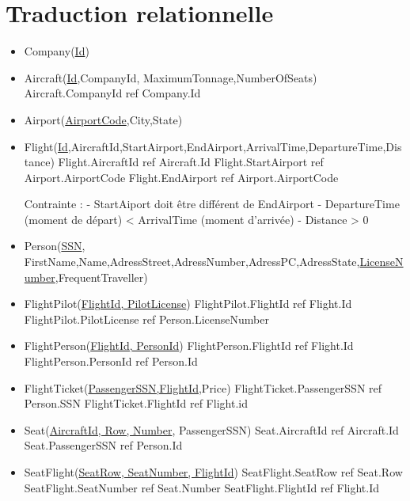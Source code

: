 \documentclass[french, utf8]{article}
\begin{document}
\section{Traduction relationnelle}
\begin{itemize}
    \item Company(\underline{Id})
    \item Aircraft(\underline{Id},CompanyId, MaximumTonnage,NumberOfSeats)
    \subitem Aircraft.CompanyId ref Company.Id

    \item Airport(\underline{AirportCode},City,State)
    \item Flight(\underline{Id},AircraftId,StartAirport,EndAirport,ArrivalTime,DepartureTime,Distance)
    \subitem Flight.AircraftId ref Aircraft.Id
    \subitem Flight.StartAirport ref Airport.AirportCode
    \subitem Flight.EndAirport ref Airport.AirportCode

    \subitem Contrainte :
    \subsubitem - StartAiport doit être différent de EndAirport
    \subsubitem - DepartureTime (moment de départ) < ArrivalTime (moment d'arrivée)
    \subsubitem - Distance > 0

    \item Person(\underline{SSN}, FirstName,Name,AdressStreet,AdressNumber,AdressPC,AdressState,\underline{LicenseNumber},FrequentTraveller)

    \item FlightPilot(\underline{FlightId, PilotLicense})
    \subitem FlightPilot.FlightId ref Flight.Id
    \subitem FlightPilot.PilotLicense ref Person.LicenseNumber

    \item FlightPerson(\underline{FlightId, PersonId})
    \subitem FlightPerson.FlightId ref Flight.Id
    \subitem FlightPerson.PersonId ref Person.Id

    \item FlightTicket(\underline{PassengerSSN,FlightId},Price)
    \subitem FlightTicket.PassengerSSN ref Person.SSN
    \subitem FlightTicket.FlightId ref Flight.id

    \item Seat(\underline{AircraftId, Row, Number}, PassengerSSN)
    \subitem Seat.AircraftId ref Aircraft.Id
    \subitem Seat.PassengerSSN ref Person.Id

    \item SeatFlight(\underline{SeatRow, SeatNumber, FlightId})
    \subitem SeatFlight.SeatRow ref Seat.Row
    \subitem SeatFlight.SeatNumber ref Seat.Number
    \subitem SeatFlight.FlightId ref Flight.Id

\end{itemize}
\end{document}

